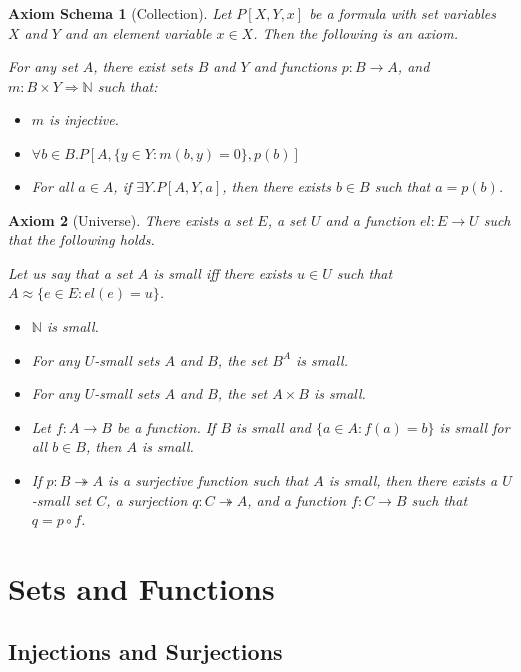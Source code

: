 \documentclass{book}
\newtheorem{ax}{Axiom}[section]
\newtheorem{axs}[ax]{Axiom Schema}
\theoremstyle{definition}
\begin{document}
\begin{axs}[Collection]
Let $P[X,Y,x]$ be a formula with set variables $X$ and $Y$ and an element variable $x \in X$. Then the following is an axiom.

For any set $A$, there exist sets $B$ and $Y$ and functions $p : B \rightarrow A$, and $m : B \times Y \Rightarrow \mathbb{N}$ such that:
\begin{itemize}
\item $m$ is injective.
\item $\forall b \in B. P[A, \{ y \in Y : m(b,y) = 0 \}, p(b)]$
\item For all $a \in A$, if $\exists Y. P[A,Y,a]$, then there exists $b \in B$ such that $a = p(b)$.
\end{itemize}
\end{axs}

\begin{ax}[Universe]
There exists a set $E$, a set $U$ and a function $el : E \rightarrow U$ such that the following holds.

Let us say that a set $A$ is \emph{small} iff there exists $u \in U$ such that $A \approx \{ e \in E : el(e) = u \}$.

\begin{itemize}
\item $\mathbb{N}$ is small.
\item For any $U$-small sets $A$ and $B$, the set $B^A$ is small.
\item For any $U$-small sets $A$ and $B$, the set $A \times B$ is small.
\item Let $f : A \rightarrow B$ be a function. If $B$ is small and $\{ a \in A : f(a) = b \}$ is small for all $b \in B$, then $A$ is small.
\item If $p : B \twoheadrightarrow A$ is a surjective function such that $A$ is small, then there exists a $U$-small set $C$, a surjection $q : C \twoheadrightarrow A$, and a function $f : C \rightarrow B$ such that $q = p \circ f$.
\end{itemize}
\end{ax}

\chapter{Sets and Functions}

\section{Injections and Surjections}
\end{document}
